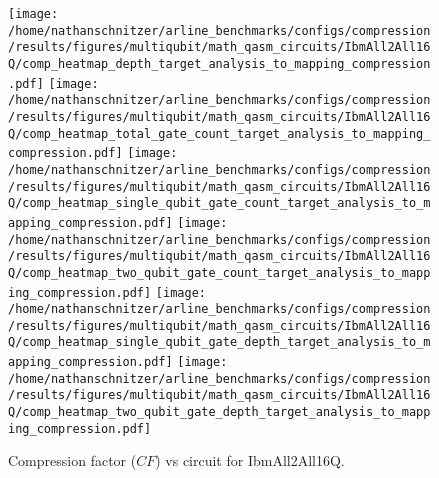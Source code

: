 \documentclass{report}%
\begin{document}
\begin{figure}[h!]%
\centering%
\texttt{[image: /home/nathanschnitzer/arline\_benchmarks/configs/compression/results/figures/multiqubit/math\_qasm\_circuits/IbmAll2All16Q/comp\_heatmap\_depth\_target\_analysis\_to\_mapping\_compression.pdf]}%
\centering%
\texttt{[image: /home/nathanschnitzer/arline\_benchmarks/configs/compression/results/figures/multiqubit/math\_qasm\_circuits/IbmAll2All16Q/comp\_heatmap\_total\_gate\_count\_target\_analysis\_to\_mapping\_compression.pdf]}%
\linebreak%
\centering%
\texttt{[image: /home/nathanschnitzer/arline\_benchmarks/configs/compression/results/figures/multiqubit/math\_qasm\_circuits/IbmAll2All16Q/comp\_heatmap\_single\_qubit\_gate\_count\_target\_analysis\_to\_mapping\_compression.pdf]}%
\centering%
\texttt{[image: /home/nathanschnitzer/arline\_benchmarks/configs/compression/results/figures/multiqubit/math\_qasm\_circuits/IbmAll2All16Q/comp\_heatmap\_two\_qubit\_gate\_count\_target\_analysis\_to\_mapping\_compression.pdf]}%
\linebreak%
\centering%
\texttt{[image: /home/nathanschnitzer/arline\_benchmarks/configs/compression/results/figures/multiqubit/math\_qasm\_circuits/IbmAll2All16Q/comp\_heatmap\_single\_qubit\_gate\_depth\_target\_analysis\_to\_mapping\_compression.pdf]}%
\centering%
\texttt{[image: /home/nathanschnitzer/arline\_benchmarks/configs/compression/results/figures/multiqubit/math\_qasm\_circuits/IbmAll2All16Q/comp\_heatmap\_two\_qubit\_gate\_depth\_target\_analysis\_to\_mapping\_compression.pdf]}%
\linebreak%
\caption{Compression factor ($CF$) vs circuit for IbmAll2All16Q.}%
\end{figure}
\end{document}
